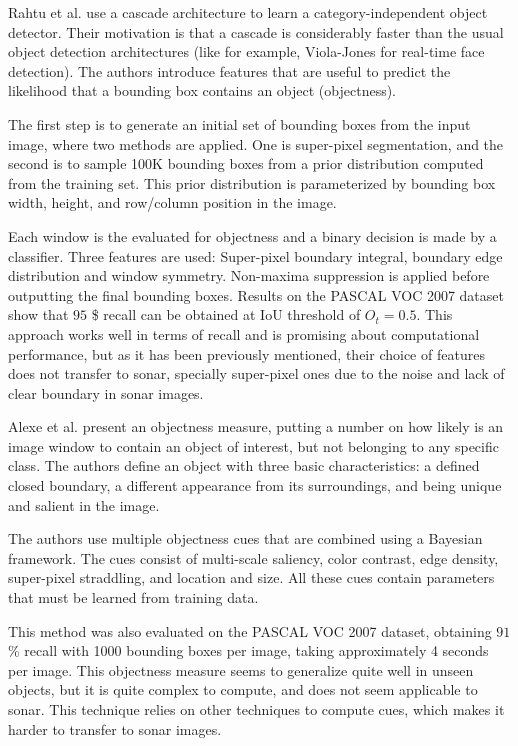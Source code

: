 Rahtu et al. \cite{rahtu2011learning} use a cascade architecture to learn a category-independent object detector. Their motivation is that a cascade is considerably faster than the usual object detection architectures (like for example, Viola-Jones \cite[1em]{viola2001rapid} for real-time face detection). The authors introduce features that are useful to predict the likelihood that a bounding box contains an object (objectness).

The first step is to generate an initial set of bounding boxes from the input image, where two methods are applied. One is super-pixel segmentation, and the second is to sample 100K bounding boxes from a prior distribution computed from the training set. This prior distribution is parameterized by bounding box width, height, and row/column position in the image.

Each window is the evaluated for objectness and a binary decision is made by a classifier. Three features are used: Super-pixel boundary integral, boundary edge distribution and window symmetry. Non-maxima suppression is applied before outputting the final bounding boxes. Results on the PASCAL VOC 2007 dataset show that $95$ \$ recall can be obtained at IoU threshold of $O_t = 0.5$. This approach works well in terms of recall and is promising about computational performance, but as it has been previously mentioned, their choice of features does not transfer to sonar, specially super-pixel ones due to the noise and lack of clear boundary in sonar images.

Alexe et al. \cite{alexe2012measuring} present an objectness measure, putting a number on how likely is an image window to contain an object of interest, but not belonging to any specific class. The authors define an object with three basic characteristics: a defined closed boundary, a different appearance from its surroundings, and being unique and salient in the image.

The authors use multiple objectness cues that are combined using a Bayesian framework. The cues consist of multi-scale saliency, color contrast, edge density, super-pixel straddling, and location and size. All these cues contain parameters that must be learned from training data.

This method was also evaluated on the PASCAL VOC 2007 dataset, obtaining $91$ \% recall with 1000 bounding boxes per image, taking approximately 4 seconds per image. This objectness measure seems to generalize quite well in unseen objects, but it is quite complex to compute, and does not seem applicable to sonar. This technique relies on other techniques to compute cues, which makes it harder to transfer to sonar images.

